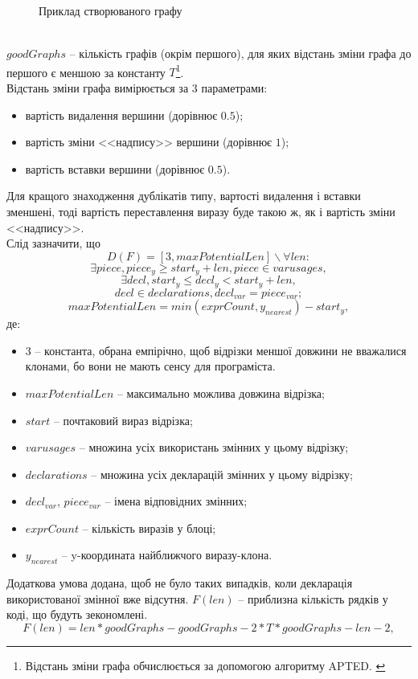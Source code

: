 \documentclass[a4paper, 14pt]{article}
\newcommand{\RNum}[1]{\uppercase\expandafter{\romannumeral #1\relax}}
\begin{document}
\begin{itemize}
{\begin{enumerate}
{\begin{figure}[h]
    \caption{Приклад створюваного графу}
    \label{fig:}
\end{figure} \\
$goodGraphs$ -- кількість графів (окрім першого), для яких відстань зміни графа до першого є меншою за константу $T$\footnote{Відстань зміни графа обчислюється за допомогою алгоритму APTED. \cite{Pawlik15}\cite{Pawlik16}}. \\
Відстань зміни графа вимірюється за 3 параметрами: 
\begin{itemize}
\item вартість видалення вершини (дорівнює $0.5$);
\item вартість зміни <<надпису>> вершини (дорівнює $1$);
\item вартість вставки вершини (дорівнює $0.5$).
\end{itemize}
Для кращого знаходження дублікатів \RNum{3} типу, вартості видалення і вставки зменшені, 
тоді вартість переставлення виразу буде такою ж, як і вартість зміни <<надпису>>.\\
Слід зазначити, що $$D(F)=[3, maxPotentialLen] \backslash \forall len: $$
$$\exists piece, piece_y \geq start_y+len, piece \in varusages, $$
$$\exists decl, start_{y} \leq decl_{y} < start_{y}+len, $$
$$decl \in declarations, decl_{var}=piece_{var};$$
$$maxPotentialLen = min(exprCount, y_{nearest})-start_y,$$ де:
\begin{itemize} 
\item $3$ -- константа, обрана емпірічно, щоб відрізки меншої довжини не вважалися клонами, бо вони не мають сенсу для програміста.
\item $maxPotentialLen$ -- максимально можлива довжина відрізка;
\item $start$ -- почтаковий вираз відрізка;
\item $varusages$ -- множина усіх використань змінних у цьому відрізку;
\item $declarations$ -- множина усіх декларацій змінних у цьому відрізку;
\item $decl_{var}$, $piece_{var}$ -- імена відповідних змінних;
\item $exprCount$ -- кількість виразів у блоці;
\item $y_{nearest}$ -- y-координата найближчого виразу-клона.
\end{itemize}
Додаткова умова додана, щоб не було таких випадків, коли декларація використованої змінної вже відсутня.
$F(len)$ -- приблизна кількість рядків у коді, що будуть зекономлені.
$$F(len) = len*goodGraphs-goodGraphs-2*T*goodGraphs-len-2,$$ 
}
\end{enumerate}}
\end{itemize}
\end{document}
